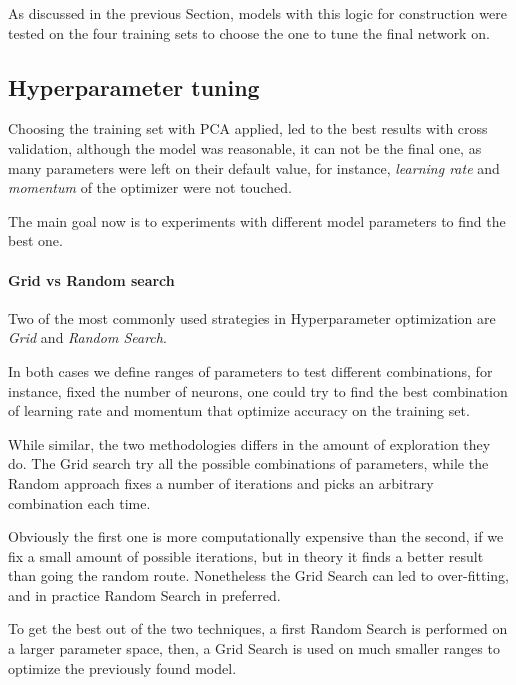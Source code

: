 As discussed in the previous Section, models with this logic for 
construction were tested on the four training sets to choose the one to tune 
the final network on.

\subsection{Hyperparameter tuning}

Choosing the training set with PCA applied, led to the best results 
with cross validation, although the model was reasonable, it can not be the 
final one, as many parameters were left on their default value, for instance, 
\emph{learning rate} and \emph{momentum} of the optimizer were not touched. 

The main goal now is to experiments with different model parameters 
to find the best one.

\paragraph{Grid vs Random search}
Two of the most commonly used strategies in Hyperparameter optimization
are \emph{Grid} and \emph{Random Search}. 

In both cases we define ranges of parameters to test different combinations, 
for instance, fixed the number of neurons, one could try to find the best 
combination of learning rate and momentum that optimize accuracy on the training set.

While similar, the two methodologies differs in the amount of exploration they do.
The Grid search try all the possible combinations of parameters, while the 
Random approach fixes a number of iterations and picks an arbitrary combination each time. 

Obviously the first one is more computationally expensive than the second, if 
we fix a small amount of possible iterations, but in theory it finds a better result
than going the random route. 
Nonetheless the Grid Search can led to over-fitting, and in practice Random 
Search in preferred.

To get the best out of the two techniques, a first Random Search is performed 
on a larger parameter space, then, a Grid Search is used on much smaller 
ranges to optimize the previously found model.

